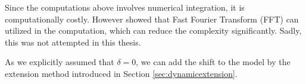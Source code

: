 Since the computations above involves numerical integration, it is computationally costly. However \textcite{carrmadan1999optionvaluation} showed that Fast Fourier Transform (FFT) can utilized in the computation, which can reduce the complexity significantly. Sadly, this was not attempted in this thesis. 

As we explicitly assumed that $\delta = 0$, we can add the shift to the model by the extension method introduced in Section \ref{sec:dynamicextension}.


